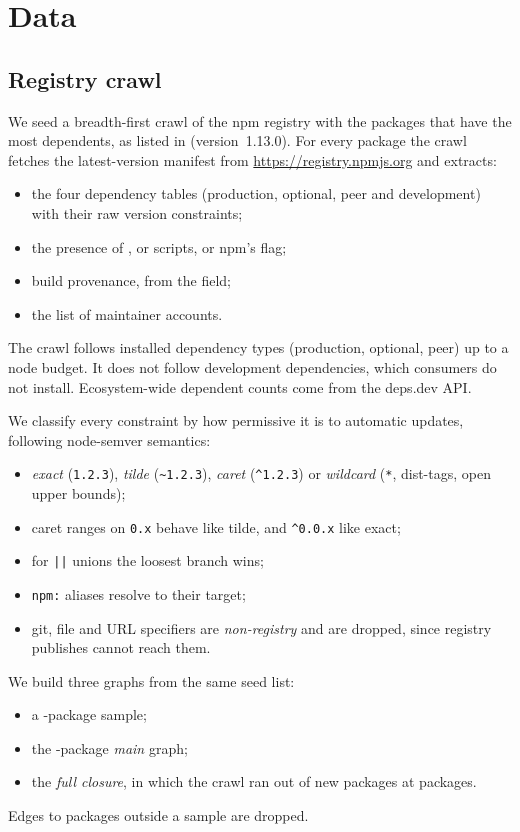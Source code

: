 \section{Data}\label{sec:data}

\subsection{Registry crawl}
We seed a breadth-first crawl of the npm registry with the \NSeeds{} packages that have the most
dependents, as listed in  (version~1.13.0). For every package the crawl fetches the
latest-version manifest from \url{https://registry.npmjs.org} and extracts:
\begin{itemize}
  \item the four dependency tables (production, optional, peer and development) with their raw version
        constraints;
  \item the presence of ,  or  scripts, or npm's
         flag;
  \item build provenance, from the  field;
  \item the list of maintainer accounts.
\end{itemize}
The crawl follows installed dependency types (production, optional, peer) up to a node budget. It does
not follow development dependencies, which consumers do not install. Ecosystem-wide dependent counts
come from the deps.dev API.

We classify every constraint by how permissive it is to automatic updates, following node-semver
semantics:
\begin{itemize}
  \item \emph{exact} (\texttt{1.2.3}), \emph{tilde} (\texttt{\~{}1.2.3}), \emph{caret}
        (\texttt{\^{}1.2.3}) or \emph{wildcard} (\texttt{*}, dist-tags, open upper bounds);
  \item caret ranges on \texttt{0.x} behave like tilde, and \texttt{\^{}0.0.x} like exact;
  \item for \texttt{||} unions the loosest branch wins;
  \item \texttt{npm:} aliases resolve to their target;
  \item git, file and URL specifiers are \emph{non-registry} and are dropped, since registry publishes
        cannot reach them.
\end{itemize}

We build three graphs from the same seed list:
\begin{itemize}
  \item a \FiveN-package sample;
  \item the \MainN-package \emph{main} graph;
  \item the \emph{full closure}, in which the crawl ran out of new packages at \FullRaw{} packages.
\end{itemize}
Edges to packages outside a sample are dropped.

